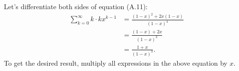 Let's differentiate both sides of equation (A.11):
\begin{align*}
    \sum_{k=0}^\infty k\cdot kx^{k-1} &= \frac{(1-x)^2+2x(1-x)}{(1-x)^4} \\
    &= \frac{(1-x)+2x}{(1-x)^3} \\
    &= \frac{1+x}{(1-x)^3}.
\end{align*}
To get the desired result, multiply all expressions in the above equation by $x$.

